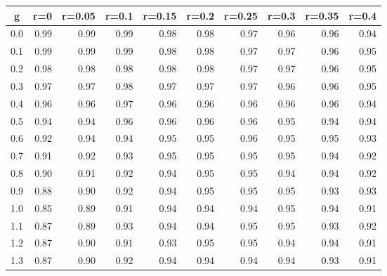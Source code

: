%
\begin{table}[!tbp]
 \begin{center}
 \begin{tabular}{rrrrrrrrrr}\hline\hline
\multicolumn{1}{c}{g}&\multicolumn{1}{c}{r=0}&\multicolumn{1}{c}{r=0.05}&\multicolumn{1}{c}{r=0.1}&\multicolumn{1}{c}{r=0.15}&\multicolumn{1}{c}{r=0.2}&\multicolumn{1}{c}{r=0.25}&\multicolumn{1}{c}{r=0.3}&\multicolumn{1}{c}{r=0.35}&\multicolumn{1}{c}{r=0.4}\tabularnewline
\hline
0.0&0.99&0.99&0.99&0.98&0.98&0.97&0.96&0.96&0.94\tabularnewline
0.1&0.99&0.99&0.99&0.98&0.98&0.97&0.97&0.96&0.95\tabularnewline
0.2&0.98&0.98&0.98&0.98&0.98&0.97&0.97&0.96&0.95\tabularnewline
0.3&0.97&0.97&0.98&0.97&0.97&0.97&0.96&0.96&0.95\tabularnewline
0.4&0.96&0.96&0.97&0.96&0.96&0.96&0.96&0.96&0.94\tabularnewline
0.5&0.94&0.94&0.96&0.96&0.96&0.96&0.95&0.94&0.94\tabularnewline
0.6&0.92&0.94&0.94&0.95&0.95&0.96&0.95&0.95&0.93\tabularnewline
0.7&0.91&0.92&0.93&0.95&0.95&0.95&0.95&0.94&0.92\tabularnewline
0.8&0.90&0.91&0.92&0.94&0.95&0.95&0.94&0.94&0.92\tabularnewline
0.9&0.88&0.90&0.92&0.94&0.95&0.95&0.95&0.93&0.93\tabularnewline
1.0&0.85&0.89&0.91&0.94&0.94&0.94&0.95&0.94&0.91\tabularnewline
1.1&0.87&0.89&0.93&0.94&0.94&0.95&0.95&0.93&0.92\tabularnewline
1.2&0.87&0.90&0.91&0.93&0.95&0.95&0.94&0.94&0.91\tabularnewline
1.3&0.87&0.90&0.92&0.94&0.94&0.94&0.94&0.93&0.91\tabularnewline
\hline
\end{tabular}

\end{center}

\end{table}

